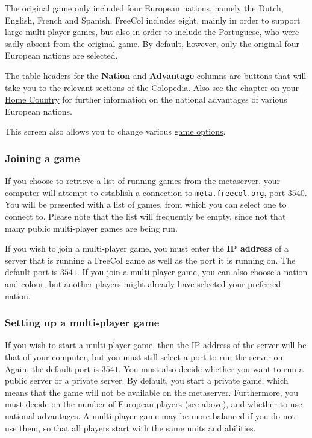 \documentclass[12pt]{book}
\newcommand{\Concept}[1]{\index{#1}\hypertarget{#1}{\textbf{#1}}}
\begin{document}
The original game only included four European nations, namely the
Dutch, English, French and Spanish. FreeCol includes eight, mainly in
order to support large multi-player games, but also in order to
include the Portuguese, who were sadly absent from the original
game. By default, however, only the original four European nations are
selected.

The table headers for the {\bf Nation} and {\bf Advantage} columns are
buttons that will take you to the relevant sections of the
Colopedia. Also see the chapter on \hyperlink{Home Country}{your Home
  Country} for further information on the national advantages of
various European nations.

This screen also allows you to change various \hyperlink{game options}
{game options}.


\hypertarget{Joining a game}{\subsubsection{Joining a game}}

If you choose to retrieve a list of running games from the metaserver,
your computer will attempt to establish a connection to
\verb$meta.freecol.org$, port $3540$. You will be
presented with a list of games, from which you can select one to
connect to. Please note that the list will frequently be empty, since
not that many public multi-player games are being run.

If you wish to join a multi-player game, you must enter the
\Concept{IP address} of a server that is running a FreeCol game as
well as the port it is running on. The default port is
$3541$. If you join a multi-player game, you can also
choose a nation and colour, but another players might already have
selected your preferred nation.


\hypertarget{Setting up a multi-player game}{\subsubsection{Setting up
    a multi-player game}}

If you wish to start a multi-player game, then the IP address of the
server will be that of your computer, but you must still select a port
to run the server on. Again, the default port is $3541$. You must also
decide whether you want to run a public server or a private server. By
default, you start a private game, which means that the game will not
be available on the metaserver. Furthermore, you must decide on the
number of European players (see above), and whether to use national
advantages. A multi-player game may be more balanced if you do not use
them, so that all players start with the same units and abilities.
\end{document}
